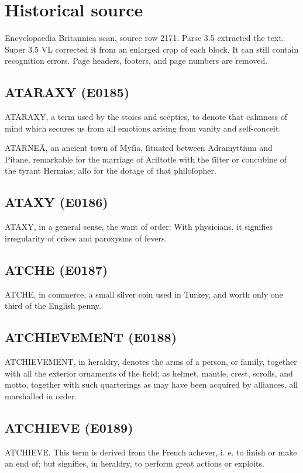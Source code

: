 \documentclass{article}
\begin{document}
\section*{Historical source}
Encyclopaedia Britannica scan, source row 2171. Parse 3.5 extracted the text. Super 3.5 VL corrected it from an enlarged crop of each block. It can still contain recognition errors.
Page headers, footers, and page numbers are removed.

\subsection*{ATARAXY (E0185)}
ATARAXY, a term used by the stoics and sceptics, to denote that calmness of mind which secures us from all emotions arising from vanity and self-conceit.

ATARNEĀ, an ancient town of Myſia, ſituated between Adramyttium and Pitane, remarkable for the marriage of Ariſtotle with the ſiſter or concubine of the tyrant Hermias; alſo for the dotage of that philoſopher.

\subsection*{ATAXY (E0186)}
ATAXY, in a general sense, the want of order: With physicians, it signifies irregularity of crises and paroxysms of fevers.

\subsection*{ATCHE (E0187)}
ATCHE, in commerce, a small silver coin used in Turkey, and worth only one third of the English penny.

\subsection*{ATCHIEVEMENT (E0188)}
ATCHIEVEMENT, in heraldry, denotes the arms of a person, or family, together with all the exterior ornaments of the field; as helmet, mantle, crest, scrolls, and motto, together with such quarterings as may have been acquired by alliances, all marshalled in order.

\subsection*{ATCHIEVE (E0189)}
ATCHIEVE. This term is derived from the French achever, i. e. to finish or make an end of; but signifies, in heraldry, to perform great actions or exploits.
\end{document}
